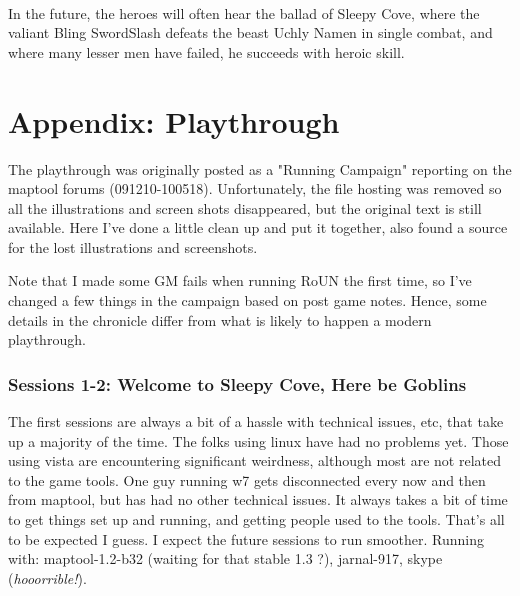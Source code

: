 \

In the future, the heroes will often hear the ballad of Sleepy Cove, where the valiant Bling SwordSlash defeats the beast Uchly Namen in single combat, and where many lesser men have failed, he succeeds with heroic skill.














\clearpage
{}
\section*{Appendix: Playthrough}
\label{sec:playthrough}

\raggedbottom

The playthrough was originally posted as a "Running Campaign" reporting on the maptool forums (091210-100518). Unfortunately, the file hosting was removed so all the illustrations and screen shots disappeared, but the original text is still available. Here I've done a little clean up and put it together, also found a source for the lost illustrations and screenshots.

Note that I made some GM fails when running RoUN the first time, so I've changed a few things in the campaign based on post game notes. Hence, some details in the chronicle differ from what is likely to happen a modern playthrough.


\subsubsection*{Sessions 1-2: Welcome to Sleepy Cove, Here be Goblins}
\noindent\small
The first sessions are always a bit of a hassle with technical issues, etc, that take up a majority of the time. The folks using linux have had no problems yet. Those using vista are encountering significant weirdness, although most are not related to the game tools. One guy running w7 gets disconnected every now and then from maptool, but has had no other technical issues.
It always takes a bit of time to get things set up and running, and getting people used to the tools. That's all to be expected I guess. I expect the future sessions to run smoother. Running with: maptool-1.2-b32 (waiting for that stable 1.3 ?), jarnal-917, skype (\emph{hooorrible!}).
\normalsize

